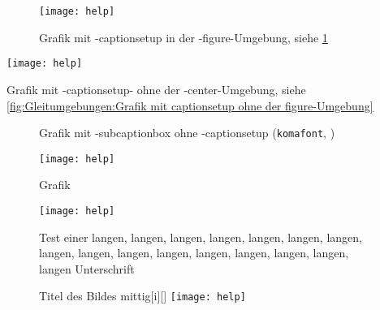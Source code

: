 \begin{figure}%
	\texttt{[image: help]}%
	\caption{Grafik mit -captionsetup in der -figure-Umgebung, siehe \ref{fig:Gleitumgebungen:Grafik mit captionsetup in der figure-Umgebung}}%
	\label{fig:Gleitumgebungen:Grafik mit captionsetup in der figure-Umgebung}%
\end{figure}%
%
{\captionsetup{type=figure,justification=centering}%
	\texttt{[image: help]}%
	\caption{Grafik mit -captionsetup- ohne der -center-Umgebung, siehe \ref{fig:Gleitumgebungen:Grafik mit captionsetup ohne der figure-Umgebung}}%
	\label{fig:Gleitumgebungen:Grafik mit captionsetup ohne der figure-Umgebung}%
}%
%
\begin{figure}%
\captionsetup{justification=centering}%
%
\hfill%
%
\hfill%
%
\hfill%
%
\caption{Grafik mit -subcaptionbox ohne -captionsetup (\texttt{komafont}, \cite{LabenbacherTeX})}%
\label{fig:Gleitumgebungen:Grafik mit subcaptionbox ohne captionsetup (Standard: komafont)}%
\end{figure}%
%
\setcounter{TUMcthelp}{1}%
{%
	\begin{figure}%
		\texttt{[image: help]}%
		\caption{Grafik \theTUMcthelp{}}%
	\end{figure}%
}%
\lipsum[1-1]
\begin{figure}%
	\texttt{[image: help]}%
	\caption{Test einer langen, langen, langen, langen, langen, langen, langen, langen, langen, langen, langen, langen, langen, langen, langen, langen Unterschrift }%
\end{figure}%
\lipsum[1-1]
\begin{figure}%
	\begingroup%
	\begin{captionbeside}{Titel des Bildes mittig}[i][\linewidth]%
		\texttt{[image: help]}
	\end{captionbeside}\label{fig:Gleitumgebungen:Titel des Bildes mittig}%
	\endgroup%
\end{figure}
